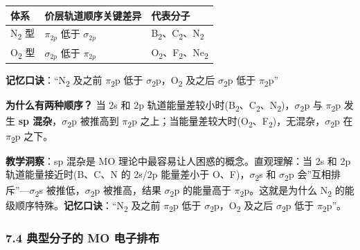 \documentclass[a4paper,11pt]{ctexart}
\newcounter{none}
\newcommand{\箭}{\ensuremath{\rightarrow}}
\newcommand{\左箭}{\ensuremath{\leftarrow}}
\newcommand{\上箭}{\ensuremath{\uparrow}}
\newcommand{\下箭}{\ensuremath{\downarrow}}
\newcommand{\衡}{\ensuremath{\rightleftharpoons}}
\newcommand{\双箭}{\ensuremath{\leftrightarrow}}
\newcommand{\约等于}{\ensuremath{\approx}}
\newcommand{\小于等于}{\ensuremath{\leq}}
\newcommand{\大于等于}{\ensuremath{\geq}}
\newcommand{\不等于}{\ensuremath{\neq}}
\newcommand{\西格马}{\ensuremath{\sigma}}
\newcommand{\派}{\ensuremath{\pi}}
\begin{document}
{\def\LTcaptype{none} %
\begin{longtable}[]{@{}lll@{}}
\toprule\noalign{}
体系 & 价层轨道顺序关键差异 & 代表分子 \\
\midrule\noalign{}
\endhead
\bottomrule\noalign{}
\endlastfoot
N\textsubscript{2} 型 & \(\pi_{2p}\) 低于 \(\sigma_{2p}\) & B\textsubscript{2}、C\textsubscript{2}、N\textsubscript{2} \\
O\textsubscript{2} 型 & \(\sigma_{2p}\) 低于 \(\pi_{2p}\) & O\textsubscript{2}、F\textsubscript{2}、Ne\textsubscript{2} \\
\end{longtable}
}

\textbf{记忆口诀}：``N\textsubscript{2} 及之前 \派\textsubscript{2}p 低于 \西格马\textsubscript{2}p，O\textsubscript{2} 及之后 \西格马\textsubscript{2}p 低于 \派\textsubscript{2}p''

\textbf{为什么有两种顺序？} 当 2s 和 2p 轨道能量差较小时(B\textsubscript{2}、C\textsubscript{2}、N\textsubscript{2})，\西格马\textsubscript{2}p 与 \派\textsubscript{2}p 发生 \textbf{sp 混杂}，\西格马\textsubscript{2}p 被推高到 \派\textsubscript{2}p 之上；当能量差较大时(O\textsubscript{2}、F\textsubscript{2})，无混杂，\西格马\textsubscript{2}p 在 \派\textsubscript{2}p 之下。

\textbf{教学洞察}：sp 混杂是 MO 理论中最容易让人困惑的概念。直观理解：当 2s 和 2p 轨道能量接近时(B、C、N 的 2s/2p 能量差小于 O、F)，\西格马\textsubscript{2}s 和 \西格马\textsubscript{2}p 会''互相排斥''---\西格马\textsubscript{2}s 被推低，\西格马\textsubscript{2}p 被推高，结果 \西格马\textsubscript{2}p 的能量高于 \派\textsubscript{2}p。这就是为什么 N\textsubscript{2} 的能级顺序特殊。\textbf{记忆口诀}：``N\textsubscript{2} 及之前 \派\textsubscript{2}p 低于 \西格马\textsubscript{2}p，O\textsubscript{2} 及之后 \西格马\textsubscript{2}p 低于 \派\textsubscript{2}p''。

\subsubsection{7.4 典型分子的 MO 电子排布}\label{ux5178ux578bux5206ux5b50ux7684-mo-ux7535ux5b50ux6392ux5e03}
\end{document}
